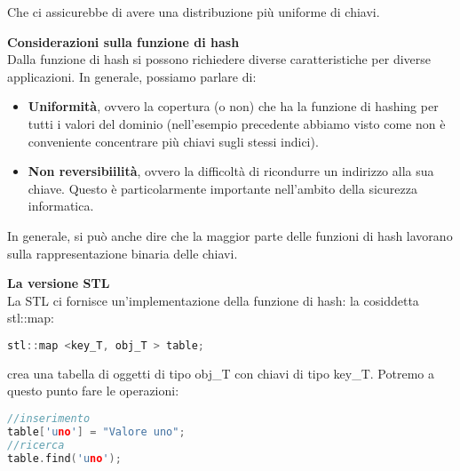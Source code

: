 \documentclass[a4paper,12pt]{article}
\begin{document}
Che ci assicurebbe di avere una distribuzione più uniforme di chiavi.
\par\smallskip
\textbf{Considerazioni sulla funzione di hash} \\
Dalla funzione di hash si possono richiedere diverse caratteristiche per diverse applicazioni. In generale, possiamo parlare di:
\begin{itemize}
  \item \textbf{Uniformità}, ovvero la copertura (o non) che ha la funzione di hashing per tutti i valori del dominio (nell'esempio precedente
    abbiamo visto come non è conveniente concentrare più chiavi sugli stessi indici).
  \item \textbf{Non reversibiilità}, ovvero la difficoltà di ricondurre un indirizzo alla sua chiave. Questo è particolarmente importante
    nell'ambito della sicurezza informatica.
\end{itemize}
In generale, si può anche dire che la maggior parte delle funzioni di hash lavorano sulla rappresentazione binaria delle chiavi.
\par\smallskip
\textbf{La versione STL} \\
La STL ci fornisce un'implementazione della funzione di hash: la cosiddetta stl::map:
\begin{lstlisting}[language=C++]
stl::map <key_T, obj_T > table;
\end{lstlisting}
crea una tabella di oggetti di tipo obj\_T con chiavi di tipo key\_T. Potremo a questo punto fare le operazioni:
\begin{lstlisting}[language=C++]
//inserimento
table['uno'] = "Valore uno";
//ricerca
table.find('uno');
\end{lstlisting}
\end{document}
